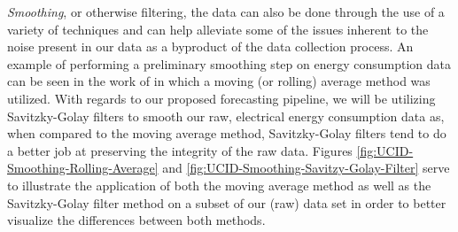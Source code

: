 \begin{adjustwidth}{-1.65cm}{-0.0cm}
\begin{enumerate}[label=Step 3.\arabic*:, leftmargin=*]
    \noindent \newline \textit{Smoothing}, or otherwise filtering, the data can also be done through the use of a variety of techniques and can help alleviate some of the issues inherent to the noise present in our data as a byproduct of the data collection process. An example of performing a preliminary smoothing step on energy consumption data can be seen in the work of \citet{Hsiao} in which a moving (or rolling) average method was utilized. With regards to our proposed forecasting pipeline, we will be utilizing Savitzky-Golay filters \cite{Savitzky} to smooth our raw, electrical energy consumption data as, when compared to the moving average method, Savitzky-Golay filters tend to do a better job at preserving the integrity of the raw data.  Figures \ref{fig:UCID-Smoothing-Rolling-Average} and \ref{fig:UCID-Smoothing-Savitzy-Golay-Filter} serve to illustrate the application of both the moving average method as well as the Savitzky-Golay filter method on a subset of our (raw) data set in order to better visualize the differences between both methods.
    

\end{enumerate}
\end{adjustwidth}
